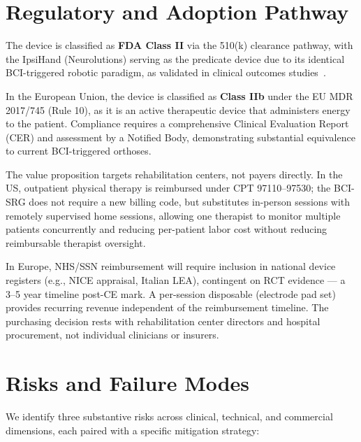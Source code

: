 \documentclass[11pt,a4paper]{article}
\begin{document}
\section{Regulatory and Adoption Pathway}

The device is classified as \textbf{FDA Class II} via the 510(k) clearance pathway, with the IpsiHand (Neurolutions) 
serving as the predicate device due to its identical BCI-triggered robotic paradigm, as validated in clinical outcomes 
studies~\cite{rustamov2025ipsihand}.

In the European Union, the device is classified as \textbf{Class IIb} under the EU MDR 2017/745 (Rule 10), 
as it is an active therapeutic device that 
administers energy to the patient. Compliance requires a comprehensive Clinical Evaluation Report (CER) 
and assessment by a Notified Body, demonstrating substantial equivalence to current BCI-triggered orthoses.

The value proposition targets rehabilitation centers, not payers directly. 
In the US, outpatient physical therapy is reimbursed under CPT 97110--97530; 
the BCI-SRG does not require a new billing code, but substitutes in-person 
sessions with remotely supervised home sessions, allowing one therapist to 
monitor multiple patients concurrently and reducing per-patient labor cost 
without reducing reimbursable therapist oversight. 

In Europe, NHS/SSN reimbursement will require inclusion in national device registers 
(e.g., NICE appraisal, Italian LEA), contingent on RCT 
evidence --- a 3--5 year timeline post-CE mark. A per-session disposable 
(electrode pad set) provides recurring revenue independent of the 
reimbursement timeline. The purchasing decision rests with rehabilitation center directors and hospital procurement, not individual clinicians or insurers.

\section{Risks and Failure Modes}

We identify three substantive risks across clinical, technical, and commercial dimensions, each paired with a specific mitigation strategy:
\end{document}
